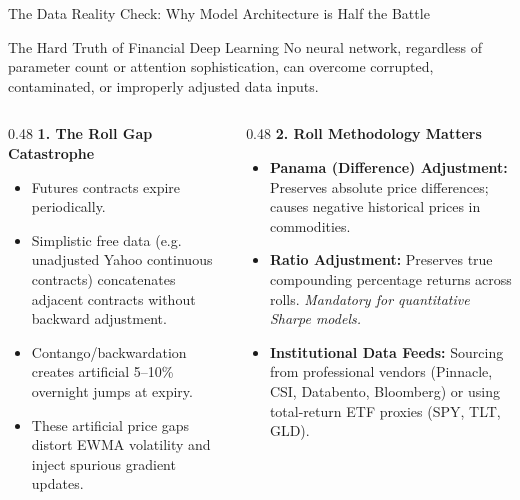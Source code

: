 \documentclass[10pt]{beamer}
\begin{document}
\begin{frame}{The Data Reality Check: Why Model Architecture is Half the Battle}
  \begin{alertblock}{The Hard Truth of Financial Deep Learning}
    No neural network, regardless of parameter count or attention sophistication, can overcome corrupted, contaminated, or improperly adjusted data inputs.
  \end{alertblock}
  \begin{columns}[t]
    \begin{column}{0.48\textwidth}
      \textbf{1. The Roll Gap Catastrophe}
      \begin{itemize}\scriptsize
        \item Futures contracts expire periodically.
        \item Simplistic free data (e.g. unadjusted Yahoo continuous contracts) concatenates adjacent contracts without backward adjustment.
        \item Contango/backwardation creates artificial 5--10\% overnight jumps at expiry.
        \item These artificial price gaps distort EWMA volatility and inject spurious gradient updates.
      \end{itemize}
    \end{column}
    \begin{column}{0.48\textwidth}
      \textbf{2. Roll Methodology Matters}
      \begin{itemize}\scriptsize
        \item \textbf{Panama (Difference) Adjustment:} Preserves absolute price differences; causes negative historical prices in commodities.
        \item \textbf{Ratio Adjustment:} Preserves true compounding percentage returns across rolls. \emph{Mandatory for quantitative Sharpe models.}
        \item \textbf{Institutional Data Feeds:} Sourcing from professional vendors (Pinnacle, CSI, Databento, Bloomberg) or using total-return ETF proxies (SPY, TLT, GLD).
      \end{itemize}
    \end{column}
  \end{columns}
\end{frame}
\end{document}
